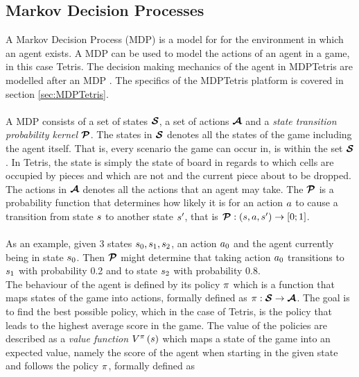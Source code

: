 \subsection{Markov Decision Processes \label{MDP}}

A Markov Decision Process (MDP) is a model for for the environment 
in which an agent exists. A MDP can be used to model the actions 
of an agent in a game, in this case Tetris. 
The decision making mechanics of the agent in MDPTetris are modelled
after an MDP \citep{mdptetris}. The specifics of the 
MDPTetris platform is covered in section \ref{sec:MDPTetris}.\\
\\
A MDP consists of a set of states $\boldsymbol{\mathcal{S}}$,
a set of actions $\boldsymbol{\mathcal{A}}$ and a 
\textit{state transition probability kernel} $\boldsymbol{\mathcal{P}}$.
The states in $\boldsymbol{\mathcal{S}}$ denotes all the states of the game
including the agent itself. That is, every scenario
the game can occur in, is within the set $\boldsymbol{\mathcal{S}}$. 
In Tetris, the state is simply the
state of board in regards to which cells are
occupied by pieces and which are not and the 
current piece about to be dropped.
The actions in $\boldsymbol{\mathcal{A}}$
denotes all the actions that an agent may take. The $\boldsymbol{\mathcal{P}}$ is
a probability function that determines how likely it is for an action $a$
to cause a transition from state $s$ to another state $s^\prime$, that is 
$\boldsymbol{\mathcal{P}} : \left( s, a, s^\prime \right) \rightarrow [0;1]$.\\\\
As an example, given 3 states 
$s_0, s_1, s_2$, an action $a_0$ and the 
agent currently being in state $s_0$. Then $\boldsymbol{\mathcal{P}}$
might determine that taking action $a_0$ transitions
to $s_1$ with probability 0.2 and to state $s_2$
with probability 0.8. \\
The behaviour of the agent is defined by its policy $\pi$
which is a function that maps states of the game into actions, formally
defined as $\pi : \boldsymbol{\mathcal{S}} \rightarrow \boldsymbol{\mathcal{A}}$.
The goal is to find the best possible policy, which in the case
of Tetris, is the policy that leads to the highest average score
in the game. The value of the policies are described as a 
\textit{value function} 
$V^{\pi}\left( s  \right)$ 
which maps a state
of the game into an expected value, namely the score of the 
agent when starting in the given state and follows
the policy $\pi$, formally defined as
